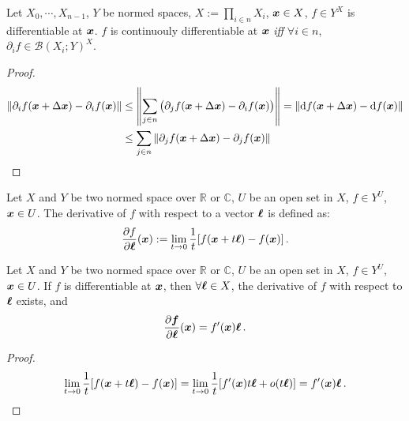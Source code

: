 \documentclass[openany]{book}
\begin{document}
\begin{theorem}
	\label{theorem: continuously differentiable iff partial derivative is continuous (differentiable mapping)}
	Let $X_0, \cdots, X_{n - 1}$, $Y$ be normed spaces, $X := \prod_{i \in n} X_i$, $\boldsymbol{x} \in X$, $f \in Y^X$ is differentiable at $\boldsymbol{x}$.
	$f$ is continuouly differentiable at $\boldsymbol{x}$ \emph{iff} $\forall i \in n$, $\partial_i f \in \mathcal B(X_i; Y)^X$.
\end{theorem}
\begin{proof}
	\begin{align*}
		\|\partial_i f(\boldsymbol{x} + \Delta \boldsymbol{x}) - \partial_i f(\boldsymbol{x})\| 
			&\leq \left\|\sum_{j \in n} \big(
					\partial_j f(\boldsymbol{x} + \Delta \boldsymbol{x}) - \partial_i f(\boldsymbol{x})\big)
				\right\|
			= \|\mathrm{d} f(\boldsymbol{x} + \Delta \boldsymbol{x}) - \mathrm{d} f(\boldsymbol{x})\|
			\\
			&\leq \sum_{j \in n}
				\|\partial_j f(\boldsymbol{x} + \Delta \boldsymbol{x}) - \partial_j f(\boldsymbol{x})\| 
	\end{align*}
\end{proof}

\begin{definition}
	Let $X$ and $Y$ be two normed space over $\mathbb R$ or $\mathbb C$, $U$ be an open set in $X$, $f \in Y^U$, $\boldsymbol{x} \in U$.
	The derivative of $f$ with respect to a vector $\boldsymbol{\ell}$ is defined as:
	\begin{equation*}
		\pdiff{f}{\bv \ell}(\bv x) 
			:= \lim_{t \to 0} \frac 1 t [f(\bv x + t \bv \ell) - f(\bv x)]\,.
	\end{equation*}
\end{definition}

\begin{theorem}
	\label{theorem: derivative with respect to a vector when differentiable}
	Let $X$ and $Y$ be two normed space over $\mathbb R$ or $\mathbb C$, $U$ be an open set in $X$, $f \in Y^U$, $\boldsymbol{x} \in U$.
	If $f$ is differentiable at $\boldsymbol{x}$, then $\forall \boldsymbol{\ell} \in X$, the derivative of $f$ with respect to $\boldsymbol{\ell}$ exists, and
	\begin{equation*}
		\pdiff{\bv f}{\bv \ell} (\bv x) = f'(\bv x) \bv \ell\,.
	\end{equation*}
\end{theorem}
\begin{proof}
	\begin{equation*}
		\lim_{t \to 0} \frac 1 t [f(\boldsymbol{x} + t \boldsymbol{\ell}) - f(\boldsymbol{x})]
			= \lim_{t \to 0} \frac 1 t [f'(\boldsymbol{x}) t \boldsymbol{\ell} + o(t \boldsymbol{\ell})]
			= f'(\boldsymbol{x}) \boldsymbol{\ell}\,.
	\end{equation*}
\end{proof}
\end{document}
